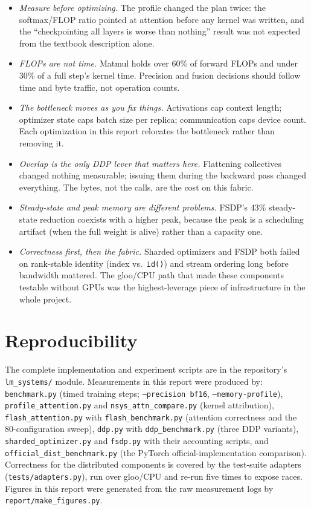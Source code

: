 \documentclass{article}
\begin{document}
\begin{itemize}
  \item \emph{Measure before optimizing.} The profile changed the plan twice: the softmax/FLOP ratio pointed at attention before any kernel was written, and the ``checkpointing all layers is worse than nothing'' result was not expected from the textbook description alone.
  \item \emph{FLOPs are not time.} Matmul holds over 60\% of forward FLOPs and under 30\% of a full step's kernel time. Precision and fusion decisions should follow time and byte traffic, not operation counts.
  \item \emph{The bottleneck moves as you fix things.} Activations cap context length; optimizer state caps batch size per replica; communication caps device count. Each optimization in this report relocates the bottleneck rather than removing it.
  \item \emph{Overlap is the only DDP lever that matters here.} Flattening collectives changed nothing measurable; issuing them during the backward pass changed everything. The bytes, not the calls, are the cost on this fabric.
  \item \emph{Steady-state and peak memory are different problems.} FSDP's 43\% steady-state reduction coexists with a higher peak, because the peak is a scheduling artifact (when the full weight is alive) rather than a capacity one.
  \item \emph{Correctness first, then the fabric.} Sharded optimizers and FSDP both failed on rank-stable identity (index vs.\ \texttt{id()}) and stream ordering long before bandwidth mattered. The gloo/CPU path that made these components testable without GPUs was the highest-leverage piece of infrastructure in the whole project.
\end{itemize}

\section{Reproducibility}

The complete implementation and experiment scripts are in the repository's \texttt{lm\_systems/} module. Measurements in this report were produced by: \texttt{benchmark.py} (timed training steps; \texttt{--precision bf16}, \texttt{--memory-profile}), \texttt{profile\_attention.py} and \texttt{nsys\_attn\_compare.py} (kernel attribution), \texttt{flash\_attention.py} with \texttt{flash\_benchmark.py} (attention correctness and the 80-configuration sweep), \texttt{ddp.py} with \texttt{ddp\_benchmark.py} (three DDP variants), \texttt{sharded\_optimizer.py} and \texttt{fsdp.py} with their accounting scripts, and \texttt{official\_dist\_benchmark.py} (the PyTorch official-implementation comparison). Correctness for the distributed components is covered by the test-suite adapters (\texttt{tests/adapters.py}), run over gloo/CPU and re-run five times to expose races. Figures in this report were generated from the raw measurement logs by \texttt{report/make\_figures.py}.
\end{document}
